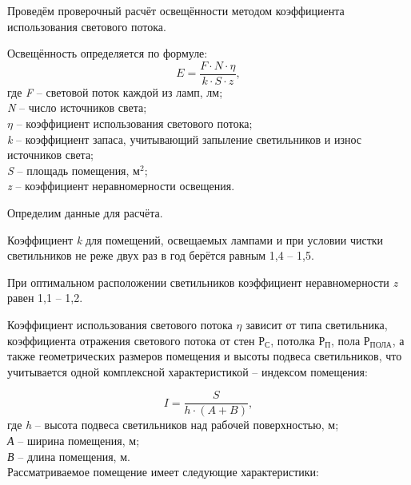 Проведём проверочный расчёт освещённости методом коэффициента использования светового потока.

Освещённость определяется по формуле:
\begin{equation}
\label{eq:sunny}
E=\frac{F{\cdot}N{\cdot}\eta }{k{\cdot}S{\cdot}z},
\end{equation}
где \textit{F} – световой поток каждой из ламп, лм;\\
\textit{N} – число источников света;\\
\textit{$\eta $} – коэффициент использования светового потока;\\
\textit{k} – коэффициент запаса, учитывающий запыление светильников и износ источников света;\\
\textit{S} – площадь помещения, м$^{2}$;\\
\textit{z} – коэффициент неравномерности освещения.

Определим данные для расчёта.

Коэффициент \textit{k} для помещений, освещаемых лампами и при условии чистки светильников не реже двух раз в год берётся равным 1,4 – 1,5.

При оптимальном расположении светильников коэффициент неравномерности \textit{z} равен 1,1 – 1,2.

Коэффициент использования светового потока $\eta$ зависит от типа светильника, коэффициента отражения светового потока от стен $\textit{Р}_{\textit{С}}$, потолка $\textit{Р}_{\textit{П}}$, пола $\textit{Р}_{\textit{ПОЛА}}$, а также геометрических размеров помещения и высоты подвеса светильников, что учитывается одной комплексной характеристикой – индексом помещения:

\begin{equation}
\label{eq:index_opt_flor}
I=\frac S{h{\cdot}(A+B)},
\end{equation}
где \textit{h} – высота подвеса светильников над рабочей поверхностью, м;\\
\textit{А} – ширина помещения, м;\\
\textit{В} – длина помещения, м.\\
Рассматриваемое помещение имеет следующие характеристики:

